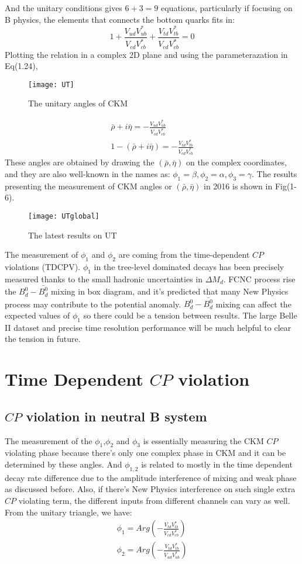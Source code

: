 And the unitary conditions gives $6 + 3 = 9$ equations, particularly if focusing on B physics, the elements that connects the bottom quarks fits in: 
\begin{equation}
1+
\frac{V_{ud}V^*_{ub}}{V_{cd}V^*_{cb}}+
\frac{V_{td}V^*_{tb}}{V_{cd}V^*_{cb}}
=0
\end{equation}
Plotting the relation in a complex 2D plane and using the parameterazation in Eq(1.24),
\begin{figure}[htpb]
	\centering
	\texttt{[image: UT]}
	\caption{The unitary angles of CKM}
\end{figure}
\begin{eqnarray}
\bar{\rho}+i\bar{\eta}=- \frac{V_{ud}V^*_{ub}}{V_{cd}V^*_{cb}}\\
1-(\bar{\rho}+i\bar{\eta})=-\frac{V_{td}V^*_{tb}}{V_{cd}V^*_{cb}}
\end{eqnarray}
These angles are obtained by drawing the $(\bar{\rho},\bar{\eta})$ on the complex coordinates, and they are also well-known in the names as: $\phi_1=\beta,\phi_2=\alpha,\phi_3=\gamma$. The results presenting the measurement of CKM angles or $(\bar{\rho},\bar{\eta})$ in 2016 is shown in Fig(1-6).
\begin{figure}[htbp]
	\centering
	\texttt{[image: UTglobal]}
	\caption{The latest results on UT\cite{b2book}}
\end{figure}

The measurement of $\phi_1$ and $\phi_2$ are coming from the time-dependent $CP$ violations (TDCPV). $\phi_1$ in the tree-level dominated decays has been precisely measured thanks to the small hadronic uncertainties in $\Delta M_d$. FCNC process rise the $B^0_d-\bar{B^0_d}$ mixing in box diagram, and it's predicted that many New Physics process may contribute to the potential anomaly.
$B_d^0-\bar{B_d^0}$ mixing can affect the expected values of $\phi_1$ so there could be a tension between results. The large Belle II dataset and precise time resolution performance will be much helpful to clear the tension in future. 

\section{Time Dependent $CP$ violation}
\subsection{ $CP$ violation in neutral B system}
The measurement of the $\phi_1$,$\phi_2$ and $\phi_3$ is essentially measuring the CKM $CP$ violating phase because there's only one complex phase in CKM and it can be determined by these angles. And $\phi_{1,2}$ is related to mostly in the time dependent decay rate difference due to the amplitude interference of mixing and weak phase as discussed before. Also, if there's New Physics interference on such single extra $CP$ violating term, the different inputs from different channels can vary as well. From the unitary triangle, we have: 
\begin{eqnarray}
\phi_1=Arg(-\frac{V_{td}V^*_{tb}}{V_{cd}V^*_{cb}})\\
\phi_2=Arg(-\frac{V_{td}V^*_{tb}}{V_{ud}V^*_{ub}})
\end{eqnarray}

